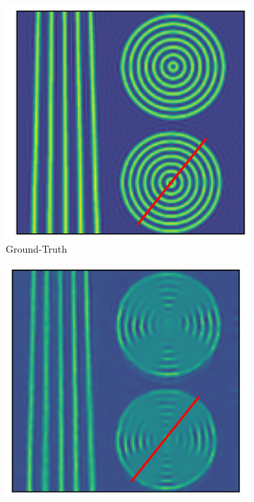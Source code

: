 \documentclass[conference]{IEEEtran}
\begin{document}
\begin{figure}[h!]
    \centering
    \begin{subfigure}[b]{0.15\textwidth}
        \centering
        \includegraphics[width=\textwidth]{images/gt_circle_line.png}
        \caption{Ground-Truth}
        \label{fig:gt_circle}
    \end{subfigure}
    \begin{subfigure}[b]{0.151\textwidth}
        \centering
        \includegraphics[width=\textwidth]{images/unet_circle_line.png}

\end{subfigure}
\end{figure}
\end{document}
